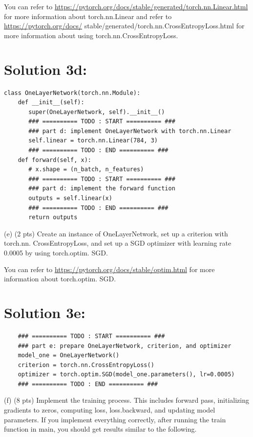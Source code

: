 \documentclass[10pt]{article}
\begin{document}
You can refer to \href{https://pytorch.org/docs/stable/generated/torch.nn.Linear.html}{https://pytorch.org/docs/stable/generated/torch.nn.Linear.html} for more information about torch.nn.Linear and refer to \href{https://pytorch.org/docs/}{https://pytorch.org/docs/} stable/generated/torch.nn.CrossEntropyLoss.html for more information about using torch.nn.CrossEntropyLoss.

\section*{Solution 3d:}

\begin{verbatim}
class OneLayerNetwork(torch.nn.Module):
    def __init__(self):
       super(OneLayerNetwork, self).__init__()
       ### ========== TODO : START ========== ###
       ### part d: implement OneLayerNetwork with torch.nn.Linear
       self.linear = torch.nn.Linear(784, 3)
       ### ========== TODO : END ========== ###
    def forward(self, x):
       # x.shape = (n_batch, n_features)
       ### ========== TODO : START ========== ###
       ### part d: implement the forward function
       outputs = self.linear(x)
       ### ========== TODO : END ========== ###
       return outputs
\end{verbatim}


(e) (2 pts) Create an instance of OneLayerNetwork, set up a criterion with torch.nn. CrossEntropyLoss, and set up a SGD optimizer with learning rate 0.0005 by using torch.optim. SGD.

You can refer to \href{https://pytorch.org/docs/stable/optim.html}{https://pytorch.org/docs/stable/optim.html} for more information about torch.optim. SGD.

\section*{Solution 3e:}

\begin{verbatim}
    ### ========== TODO : START ========== ###
    ### part e: prepare OneLayerNetwork, criterion, and optimizer
    model_one = OneLayerNetwork()
    criterion = torch.nn.CrossEntropyLoss()
    optimizer = torch.optim.SGD(model_one.parameters(), lr=0.0005)
    ### ========== TODO : END ========== ###
\end{verbatim}


(f) (8 pts) Implement the training process. This includes forward pass, initializing gradients to zeros, computing loss, loss.backward, and updating model parameters. If you implement everything correctly, after running the train function in main, you should get results similar to the following.
\end{document}
